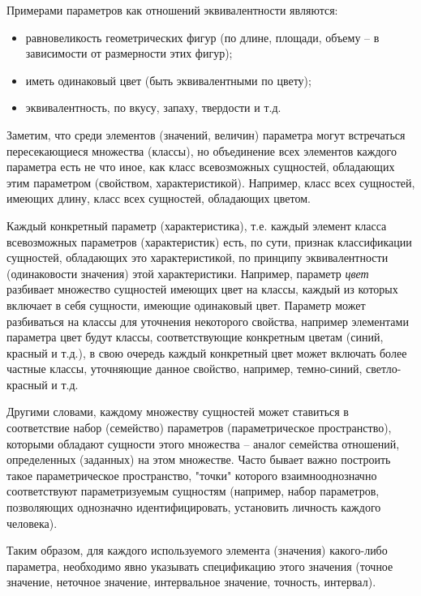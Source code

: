 Примерами параметров как отношений эквивалентности являются:

\begin{itemize}
		\item равновеликость геометрических фигур (по длине, площади, объему -- в зависимости от размерности этих фигур);
		\item иметь одинаковый цвет (быть эквивалентными по цвету);
		\item эквивалентность, по вкусу, запаху, твердости и т.д.
\end{itemize}
		
Заметим, что среди элементов (значений, величин) параметра могут встречаться пересекающиеся множества (классы), но объединение всех элементов каждого параметра есть не что иное, как класс всевозможных сущностей, обладающих этим параметром (свойством, характеристикой). Например, класс всех сущностей, имеющих длину, класс всех сущностей, обладающих цветом.
		
Каждый конкретный параметр (характеристика), т.е. каждый элемент класса всевозможных параметров (характеристик) есть, по сути, признак классификации сущностей, обладающих это характеристикой, по принципу эквивалентности (одинаковости значения) этой характеристики. Например, параметр \textit{цвет} разбивает множество сущностей имеющих цвет на классы, каждый из которых включает в себя сущности, имеющие одинаковый цвет. Параметр может разбиваться на классы для уточнения некоторого свойства, например элементами параметра цвет будут классы, соответствующие конкретным цветам (синий, красный и т.д.), в свою очередь каждый конкретный цвет может включать более частные классы, уточняющие данное свойство, например, темно-синий, светло-красный и т.д.
		
Другими словами, каждому множеству сущностей может ставиться в соответствие набор (семейство) параметров (параметрическое пространство), которыми обладают сущности этого множества -- аналог семейства отношений, определенных (заданных) на этом множестве. Часто бывает важно построить такое параметрическое пространство, "точки"{} которого взаимнооднозначно соответствуют параметризуемым сущностям (например, набор параметров, позволяющих однозначно идентифицировать, установить личность каждого человека). 
		
Таким образом, для каждого используемого элемента (значения) какого-либо параметра, необходимо явно указывать спецификацию этого значения (точное значение, неточное значение, интервальное значение, точность, интервал).
		

